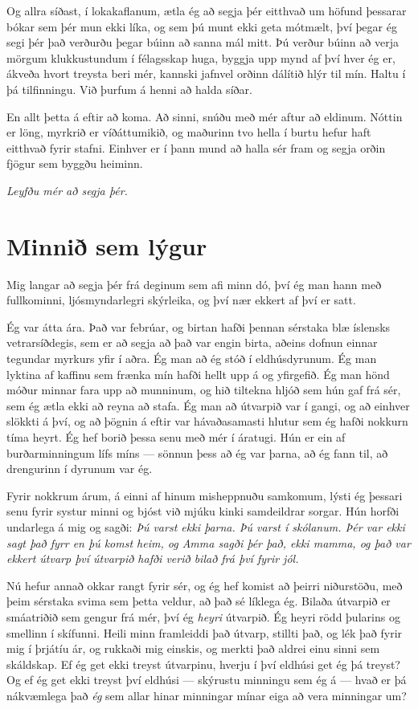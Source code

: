 Og allra síðast, í lokakaflanum, ætla ég að segja þér eitthvað um höfund þessarar bókar sem þér mun ekki líka, og sem þú munt ekki geta mótmælt, því þegar ég segi þér það verðurðu þegar búinn að sanna mál mitt. Þú verður búinn að verja mörgum klukkustundum í félagsskap huga, byggja upp mynd af því hver ég er, ákveða hvort treysta beri mér, kannski jafnvel orðinn dálítið hlýr til mín. Haltu í þá tilfinningu. Við þurfum á henni að halda síðar.

En allt þetta á eftir að koma. Að sinni, snúðu með mér aftur að eldinum. Nóttin er löng, myrkrið er víðáttumikið, og maðurinn tvo hella í burtu hefur haft eitthvað fyrir stafni. Einhver er í þann mund að halla sér fram og segja orðin fjögur sem byggðu heiminn.

\emph{Leyfðu mér að segja þér.}

\chapter{Minnið sem lýgur}

Mig langar að segja þér frá deginum sem afi minn dó, því ég man hann með fullkominni, ljósmyndarlegri skýrleika, og því nær ekkert af því er satt.

Ég var átta ára. Það var febrúar, og birtan hafði þennan sérstaka blæ íslensks vetrarsíðdegis, sem er að segja að það var engin birta, aðeins dofnun einnar tegundar myrkurs yfir í aðra. Ég man að ég stóð í eldhúsdyrunum. Ég man lyktina af kaffinu sem frænka mín hafði hellt upp á og yfirgefið. Ég man hönd móður minnar fara upp að munninum, og hið tiltekna hljóð sem hún gaf frá sér, sem ég ætla ekki að reyna að stafa. Ég man að útvarpið var í gangi, og að einhver slökkti á því, og að þögnin á eftir var hávaðasamasti hlutur sem ég hafði nokkurn tíma heyrt. Ég hef borið þessa senu með mér í áratugi. Hún er ein af burðarminningum lífs míns — sönnun þess að ég var þarna, að ég fann til, að drengurinn í dyrunum var ég.

Fyrir nokkrum árum, á einni af hinum misheppnuðu samkomum, lýsti ég þessari senu fyrir systur minni og bjóst við mjúku kinki samdeildrar sorgar. Hún horfði undarlega á mig og sagði: \emph{Þú varst ekki þarna. Þú varst í skólanum. Þér var ekki sagt það fyrr en þú komst heim, og Amma sagði þér það, ekki mamma, og það var ekkert útvarp því útvarpið hafði verið bilað frá því fyrir jól.}

Nú hefur annað okkar rangt fyrir sér, og ég hef komist að þeirri niðurstöðu, með þeim sérstaka svima sem þetta veldur, að það sé líklega ég. Bilaða útvarpið er smáatriðið sem gengur frá mér, því ég \emph{heyri} útvarpið. Ég heyri rödd þularins og smellinn í skífunni. Heili minn framleiddi það útvarp, stillti það, og lék það fyrir mig í þrjátíu ár, og rukkaði mig einskis, og merkti það aldrei einu sinni sem skáldskap. Ef ég get ekki treyst útvarpinu, hverju í því eldhúsi get ég þá treyst? Og ef ég get ekki treyst því eldhúsi — skýrustu minningu sem ég á — hvað er þá nákvæmlega það \emph{ég} sem allar hinar minningar mínar eiga að vera minningar um?

